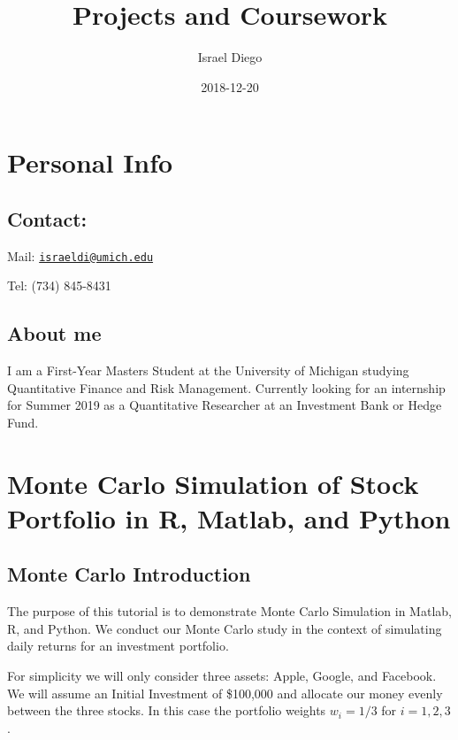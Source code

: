 \documentclass[]{book}
\title{Projects and Coursework}
\author{Israel Diego}
\date{2018-12-20}
\begin{document}
\maketitle

{
\setcounter{tocdepth}{1}
\tableofcontents
}
\hypertarget{personal-info}{%
\chapter{Personal Info}\label{personal-info}}

\hypertarget{contact}{%
\section{Contact:}\label{contact}}

Mail: \href{mailto:israeldi@umich.edu}{\nolinkurl{israeldi@umich.edu}}

Tel: (734) 845-8431

\hypertarget{about-me}{%
\section{About me}\label{about-me}}

I am a First-Year Masters Student at the University of Michigan studying
Quantitative Finance and Risk Management. Currently looking for an internship
for Summer 2019 as a Quantitative Researcher at an Investment Bank or Hedge Fund.

\hypertarget{monte-carlo-simulation-of-stock-portfolio-in-r-matlab-and-python}{%
\chapter{Monte Carlo Simulation of Stock Portfolio in R, Matlab, and Python}\label{monte-carlo-simulation-of-stock-portfolio-in-r-matlab-and-python}}

\hypertarget{monte-carlo-introduction}{%
\section{Monte Carlo Introduction}\label{monte-carlo-introduction}}

The purpose of this tutorial is to demonstrate Monte Carlo Simulation in Matlab,
R, and Python. We conduct our Monte Carlo study in the context of simulating
daily returns for an investment portfolio.

For simplicity we will only consider three assets: Apple, Google, and Facebook.
We will assume an Initial Investment of \$100,000 and allocate our money evenly
between the three stocks. In this case the portfolio weights \(w_i = 1/3\) for
\(i = 1,2,3\).
\end{document}
